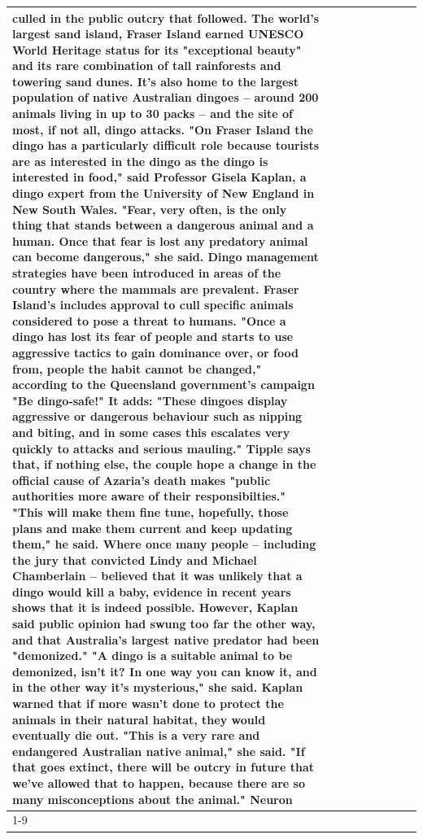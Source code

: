 \begin{table}[H]
\begin{tabular}{lllrlllll}
culled in the public outcry that followed. The world's largest sand island, Fraser Island earned UNESCO World Heritage status for its "exceptional beauty" and its rare combination of tall rainforests and towering sand dunes. It's also home to the largest population of native Australian dingoes -- around 200 animals living in up to 30 packs -- and the site of most, if not all, dingo attacks. "On Fraser Island the dingo has a particularly difficult role because tourists are as interested in the dingo as the dingo is interested in food," said Professor Gisela Kaplan, a dingo expert from the University of New England in New South Wales. "Fear, very often, is the only thing that stands between a dangerous animal and a human. Once that fear is lost any predatory animal can become dangerous," she said. Dingo management strategies have been introduced in areas of the country where the mammals are prevalent. Fraser Island's includes approval to cull specific animals considered to pose a threat to humans. "Once a dingo has lost its fear of people and starts to use aggressive tactics to gain dominance over, or food from, people the habit cannot be changed," according to the Queensland government's campaign "Be dingo-safe!" It adds: "These dingoes display aggressive or dangerous behaviour such as nipping and biting, and in some cases this escalates very quickly to attacks and serious mauling." Tipple says that, if nothing else, the couple hope a change in the official cause of Azaria's death makes "public authorities more aware of their responsibilties." "This will make them fine tune, hopefully, those plans and make them current and keep updating them," he said. Where once many people -- including the jury that convicted Lindy and Michael Chamberlain -- believed that it was unlikely that a dingo would kill a baby, evidence in recent years shows that it is indeed possible. However, Kaplan said public opinion had swung too far the other way, and that Australia's largest native predator had been "demonized." "A dingo is a suitable animal to be demonized, isn't it? In one way you can know it, and in the other way it's mysterious," she said. Kaplan warned that if more wasn't done to protect the animals in their natural habitat, they would eventually die out. "This is a very rare and endangered Australian native animal," she said. "If that goes extinct, there will be outcry in future that we've allowed that to happen, because there are so many misconceptions about the animal." Neuron \\
\cline{1-9}

\end{tabular}
\end{table}
